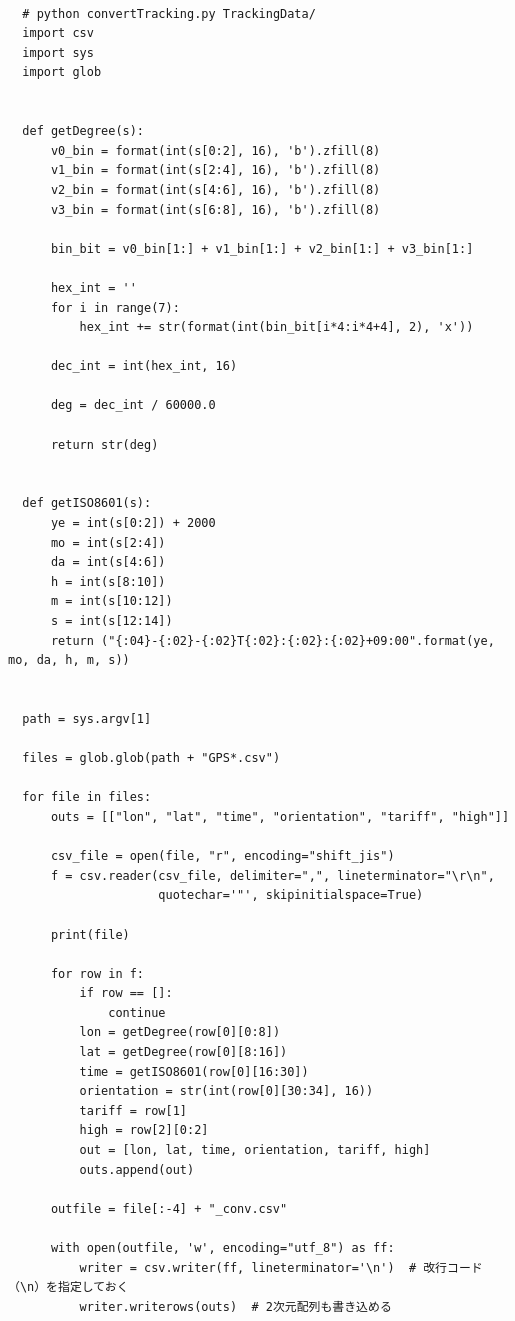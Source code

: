 \documentclass[twocolumn, a4paper, 9pt]{jarticle}
\begin{document}
\begin{lstlisting}[caption=convertTracking.py, label=convertTracking]

  # python convertTracking.py TrackingData/
  import csv
  import sys
  import glob
  
  
  def getDegree(s):
      v0_bin = format(int(s[0:2], 16), 'b').zfill(8)
      v1_bin = format(int(s[2:4], 16), 'b').zfill(8)
      v2_bin = format(int(s[4:6], 16), 'b').zfill(8)
      v3_bin = format(int(s[6:8], 16), 'b').zfill(8)
  
      bin_bit = v0_bin[1:] + v1_bin[1:] + v2_bin[1:] + v3_bin[1:]
  
      hex_int = ''
      for i in range(7):
          hex_int += str(format(int(bin_bit[i*4:i*4+4], 2), 'x'))
  
      dec_int = int(hex_int, 16)
  
      deg = dec_int / 60000.0
  
      return str(deg)
  
  
  def getISO8601(s):
      ye = int(s[0:2]) + 2000
      mo = int(s[2:4])
      da = int(s[4:6])
      h = int(s[8:10])
      m = int(s[10:12])
      s = int(s[12:14])
      return ("{:04}-{:02}-{:02}T{:02}:{:02}:{:02}+09:00".format(ye, mo, da, h, m, s))
  
  
  path = sys.argv[1]
  
  files = glob.glob(path + "GPS*.csv")
  
  for file in files:
      outs = [["lon", "lat", "time", "orientation", "tariff", "high"]]
  
      csv_file = open(file, "r", encoding="shift_jis")
      f = csv.reader(csv_file, delimiter=",", lineterminator="\r\n",
                     quotechar='"', skipinitialspace=True)
  
      print(file)
  
      for row in f:
          if row == []:
              continue
          lon = getDegree(row[0][0:8])
          lat = getDegree(row[0][8:16])
          time = getISO8601(row[0][16:30])
          orientation = str(int(row[0][30:34], 16))
          tariff = row[1]
          high = row[2][0:2]
          out = [lon, lat, time, orientation, tariff, high]
          outs.append(out)
  
      outfile = file[:-4] + "_conv.csv"
  
      with open(outfile, 'w', encoding="utf_8") as ff:
          writer = csv.writer(ff, lineterminator='\n')  # 改行コード（\n）を指定しておく
          writer.writerows(outs)  # 2次元配列も書き込める
\end{lstlisting}  
\end{document}
